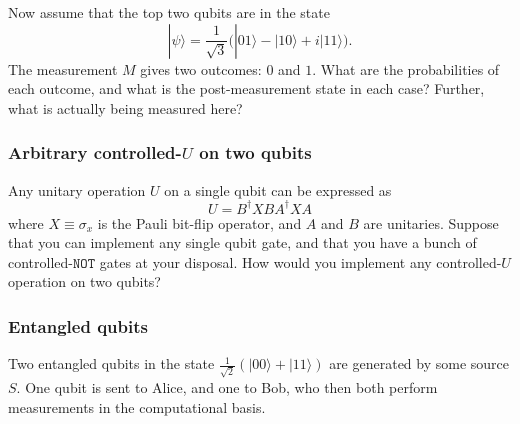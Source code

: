 \documentclass[fleqn]{article}
\begin{document}
Now assume that the top two qubits are in the state
\[
  |\psi\rangle
  = \frac{1}{\sqrt3}\big( |01\rangle - |10\rangle + i|11\rangle \big).
\]
The measurement \(M\) gives two outcomes: \(0\) and \(1\).
What are the probabilities of each outcome, and what is the post-measurement state in each case?
Further, what is actually being measured here?

\hypertarget{arbitrary-controlled-u-on-two-qubits}{%
\subsubsection{\texorpdfstring{Arbitrary controlled-\(U\) on two qubits}{Arbitrary controlled-U on two qubits}}\label{arbitrary-controlled-u-on-two-qubits}}

Any unitary operation \(U\) on a single qubit can be expressed as
\[
  U = B^\dagger XBA^\dagger XA
\]
where \(X\equiv\sigma_x\) is the Pauli bit-flip operator, and \(A\) and \(B\) are unitaries.
Suppose that you can implement any single qubit gate, and that you have a bunch of controlled-\(\texttt{NOT}\) gates at your disposal.
How would you implement any controlled-\(U\) operation on two qubits?

\hypertarget{entangled-qubits}{%
\subsubsection{Entangled qubits}\label{entangled-qubits}}

Two entangled qubits in the state \(\frac{1}{\sqrt2}(|00\rangle+|11\rangle)\) are generated by some source \(S\).
One qubit is sent to Alice, and one to Bob, who then both perform measurements in the computational basis.
\end{document}
